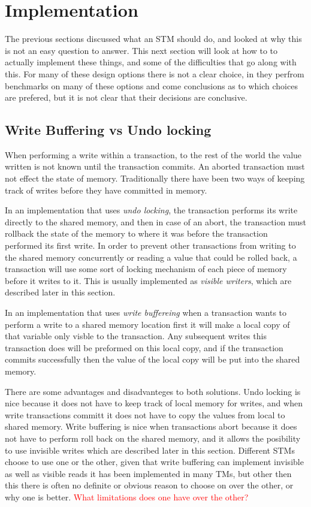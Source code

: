 \section{Implementation}
The previous sections discussed what an STM should do, and looked at why this is not an easy question to answer.
This next section will look at how to to actually implement these things, and some of the difficulties that go along with this.
For many of these design options there is not a clear choice, in \cite{1123001} they perfrom benchmarks on many of these options and come conclusions as to which choices are prefered, but it is not clear that their decisions are conclusive.

\subsection{Write Buffering vs Undo locking}
When performing a write within a transaction, to the rest of  the world the value written is not known until the transaction commits.
An aborted transaction must not effect the state of memory.
Traditionally there have been two ways of keeping track of writes before they have committed in memory.

In an implementation that uses \emph{undo locking}, the transaction performs its write directly to the shared memory, and then in case of an abort, the transaction must rollback the state of the memory to where it was before the transaction performed its first write.
In order to prevent other transactions from writing to the shared memory concurrently or reading a value that could be rolled back, a transaction will use some sort of locking mechanism of each piece of memory before it writes to it.
This is usually implemented as \emph{visible writers}, which are described later in this section.

In an implementation that uses \emph{write buffereing} when a transaction wants to perform a write to a shared memory location first it will make a local copy of that variable only visble to the transaction.
Any subsequent writes this transaction does will be preformed on this local copy, and if the transaction commits successfully then the value of the local copy will be put into the shared memory.

There are some advantages and disadvanteges to both solutions.
Undo locking is nice because it does not have to keep track of local memory for writes, and when write transactions committ it does not have to copy the values from local to shared memory.
Write buffering is nice when transactions abort because it does not have to perform roll back on the shared memory, and it allows the posibility to use invisible writes which are described later in this section.
Different STMs choose to use one or the other, given that write buffering can implement invisible as well as visible reads it has been implemented in many TMs, but other then this there is often no definite or obvious reason to choose on over the other, or why one is better.
\textcolor{Red}{What limitations does one have over the other?}

